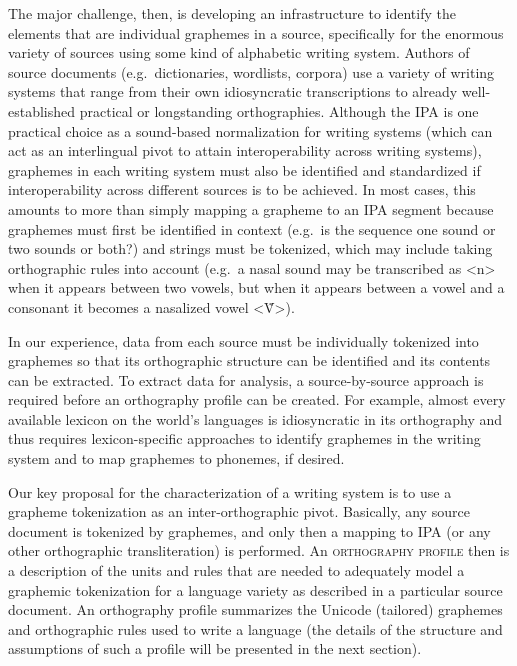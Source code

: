 The major challenge, then, is developing an infrastructure to identify the
elements that are individual graphemes in a source, specifically for the
enormous variety of sources using some kind of alphabetic writing system.
Authors of source documents (e.g.~dictionaries, wordlists, corpora) use a
variety of writing systems that range from their own idiosyncratic
transcriptions to already well-established practical or longstanding
orthographies. Although the IPA is one practical choice as a sound-based
normalization for writing systems (which can act as an interlingual pivot to
attain interoperability across writing systems), graphemes in each writing
system must also be identified and standardized if interoperability across
different sources is to be achieved. In most cases, this amounts to more than
simply mapping a grapheme to an IPA segment because graphemes must first be
identified in context (e.g.~is the sequence one sound or two sounds or both?)
and strings must be tokenized, which may include taking orthographic rules into
account (e.g.~a nasal sound may be transcribed as <n> when it appears between 
two vowels, but when it appears between a vowel and a consonant it becomes 
a nasalized vowel <Ṽ>).

In our experience, data from each source must be
individually tokenized into graphemes so that its orthographic structure can be 
identified and its contents can be extracted. To extract data for analysis, a
source-by-source approach is required before an orthography profile can be
created. For example, almost every available lexicon on the world's languages is
idiosyncratic in its orthography and thus requires lexicon-specific approaches
to identify graphemes in the writing system and to map graphemes to phonemes, if
desired.

Our key proposal for the characterization of a writing system is to use a
grapheme tokenization as an inter-orthographic pivot. Basically, any source
document is tokenized by graphemes, and only then a mapping to IPA (or any other
orthographic transliteration) is performed. An \textsc{orthography profile} then is a
description of the units and rules that are needed to adequately model a
graphemic tokenization for a language variety as described in a particular
source document. An orthography profile summarizes the Unicode (tailored)
graphemes and orthographic rules used to write a language (the details of the
structure and assumptions of such a profile will be presented in the next
section).



